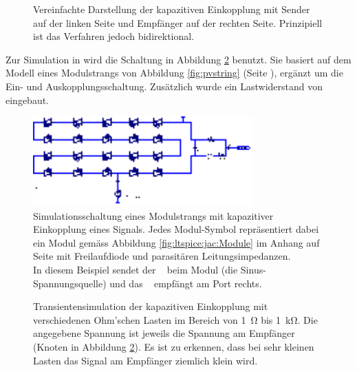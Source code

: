 \begin{figure}[h!tb]
    \centering
    
    \caption{%
        Vereinfachte Darstellung  der kapazitiven  Einkopplung mit  Sender auf
        der linken  Seite und  Empf\"anger auf der  rechten Seite. Prinzipiell
        ist das Verfahren jedoch bidirektional.%
    }
    \label{fig:circ:coupling:capacitive}
\end{figure}

Zur   Simulation   in     wird   die   Schaltung  in   Abbildung
\ref{fig:ltspice:capacitive:string} benutzt. Sie basiert  auf dem Modell eines
Modulstrangs von Abbildung  \ref{fig:pvstring} (Seite \pageref{fig:pvstring}),
erg\"anzt  um  die  Ein-  und  Auskopplungsschaltung. Zus\"atzlich  wurde  ein
Lastwiderstand von eingebaut.

\begin{figure}[h!tb]
    \centering
    \includegraphics[width=0.75\textwidth]{images/ltspice/jac/capacitive.eps}
    \caption{%
        Simulationsschaltung  eines Modulstrangs  mit kapazitiver  Einkopplung
        eines  Signals. Jedes  Modul-Symbol  repr\"asentiert dabei  ein  Modul
        gem\"ass  Abbildung \ref{fig:ltspice:jac:Module}  im Anhang  auf Seite
        \pageref{fig:ltspice:jac:Module}  mit Freilaufdiode  und parasit\"aren
        Leitungsimpedanzen.\protect\\
        In   diesem   Beispiel   sendet   der   \Sensor~   beim   Modul   (die
        Sinus-Spannungsquelle)   und   das   \Master~   empf\"angt   am   Port
         rechts.%
    }
    \label{fig:ltspice:capacitive:string}
\end{figure}

\begin{figure}[h!tb]
    
    \caption{%
        Transientensimulation  der kapazitiven  Einkopplung mit  verschiedenen
        Ohm'schen     Lasten    im     Bereich     von    \SI{1}{\ohm}     bis
        \SI{1}{\kilo\ohm}. Die   angegebene    Spannung   ist    jeweils   die
        Spannung   am  Empf\"anger   (Knoten     in  Abbildung
        \ref{fig:ltspice:capacitive:string}).   Es ist  zu erkennen,  dass bei
        sehr kleinen Lasten das Signal am Empf\"anger ziemlich klein wird.%
    }
    \label{fig:simu:capacitive:tran}
\end{figure}

